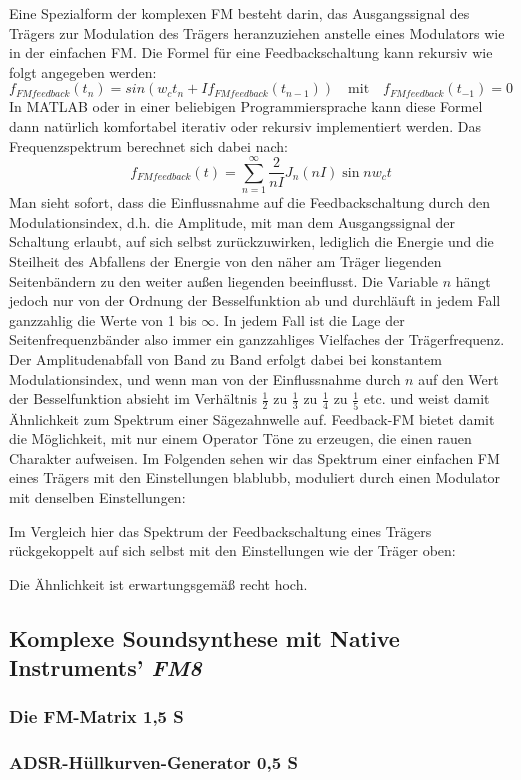 Eine Spezialform der komplexen FM besteht darin, das Ausgangssignal des Trägers zur Modulation des Trägers heranzuziehen anstelle eines Modulators wie in der einfachen FM. Die Formel für eine Feedbackschaltung kann rekursiv wie folgt angegeben werden:
\begin{equation}
f_{FMfeedback}(t_{n}) = sin(w_{c}t_{n} + If_{FMfeedback}(t_{n-1})) \quad \text{mit} \quad f_{FMfeedback}(t_{-1}) = 0
\end{equation}
In MATLAB oder in einer beliebigen Programmiersprache kann diese Formel dann natürlich komfortabel iterativ oder rekursiv implementiert werden.
Das Frequenzspektrum berechnet sich dabei nach:
\begin{equation}
f_{FMfeedback}(t) = \sum_{n=1}^{\infty}\frac{2}{nI}J_n(nI)\sin{nw_{c}t}
\end{equation}
Man sieht sofort, dass die Einflussnahme auf die Feedbackschaltung durch den Modulationsindex, d.h. die Amplitude, mit man dem Ausgangssignal der Schaltung erlaubt, auf sich selbst zurückzuwirken, lediglich die Energie und die Steilheit des Abfallens der Energie von den näher am Träger liegenden Seitenbändern zu den weiter außen liegenden beeinflusst. Die Variable $n$ hängt jedoch nur von der Ordnung der Besselfunktion ab und durchläuft in jedem Fall ganzzahlig die Werte von 1 bis $\infty$. In jedem Fall ist die Lage der Seitenfrequenzbänder also immer ein ganzzahliges Vielfaches der Trägerfrequenz. Der Amplitudenabfall von Band zu Band erfolgt dabei bei konstantem Modulationsindex, und wenn man von der Einflussnahme durch $n$ auf den Wert der Besselfunktion absieht im Verhältnis $\frac{1}{2}$ zu $\frac{1}{3}$ zu $\frac{1}{4}$ zu $\frac{1}{5}$ etc. und weist damit Ähnlichkeit zum Spektrum einer Sägezahnwelle auf. Feedback-FM bietet damit die Möglichkeit, mit nur einem Operator Töne zu erzeugen, die einen rauen Charakter aufweisen. Im Folgenden sehen wir das Spektrum einer einfachen FM eines Trägers mit den Einstellungen blablubb, moduliert durch einen Modulator mit denselben Einstellungen:

Im Vergleich hier das Spektrum der Feedbackschaltung eines Trägers rückgekoppelt auf sich selbst mit den Einstellungen wie der Träger oben:

Die Ähnlichkeit ist erwartungsgemäß recht hoch.

\subsection{Komplexe Soundsynthese mit Native Instruments' \textit{FM8}}

\subsubsection{Die FM-Matrix 1,5 S}


\subsubsection{ADSR-Hüllkurven-Generator 0,5 S}
